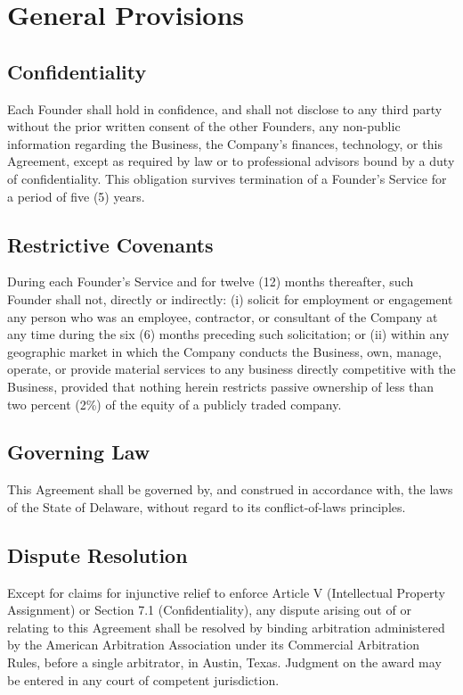 \section{General Provisions}

\subsection{Confidentiality} Each Founder shall hold in confidence, and shall not disclose to any third party without the prior written consent of the other Founders, any non-public information regarding the Business, the Company's finances, technology, or this Agreement, except as required by law or to professional advisors bound by a duty of confidentiality. This obligation survives termination of a Founder's Service for a period of five (5) years.

\subsection{Restrictive Covenants} During each Founder's Service and for twelve (12) months thereafter, such Founder shall not, directly or indirectly: (i) solicit for employment or engagement any person who was an employee, contractor, or consultant of the Company at any time during the six (6) months preceding such solicitation; or (ii) within any geographic market in which the Company conducts the Business, own, manage, operate, or provide material services to any business directly competitive with the Business, provided that nothing herein restricts passive ownership of less than two percent (2\%) of the equity of a publicly traded company.

\subsection{Governing Law} This Agreement shall be governed by, and construed in accordance with, the laws of the State of Delaware, without regard to its conflict-of-laws principles.

\subsection{Dispute Resolution} Except for claims for injunctive relief to enforce Article V (Intellectual Property Assignment) or Section 7.1 (Confidentiality), any dispute arising out of or relating to this Agreement shall be resolved by binding arbitration administered by the American Arbitration Association under its Commercial Arbitration Rules, before a single arbitrator, in Austin, Texas. Judgment on the award may be entered in any court of competent jurisdiction.

